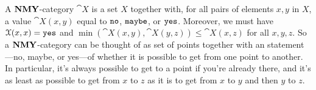 \documentclass[7Sketches]{subfiles}
\begin{document}
{
A $\mathbf{NMY}$-category $\cat{X}$ is a set $X$ together with, for all pairs of elements
$x,y$ in $X$, a value $\cat{X}(x,y)$ equal to $\mathtt{no}$, $\mathtt{maybe}$, or
$\mathtt{yes}$. Moreover, we must have $\mathcal{X}(x,x) = \mathtt{yes}$ and
$\min(\cat{X}(x,y), \cat{X}(y,z)) \le \cat{X}(x,z)$ for all $x,y,z$. So a
$\mathbf{NMY}$-category can be thought of as set of points together with an
statement---no, maybe, or yes---of whether it is possible to get from one point
to another. In particular, it's always possible to get to a point if you're already
there, and it's as least as possible to get from $x$ to $z$ as it is to get from
$x$ to $y$ and then $y$ to $z$.
}
\end{document}
